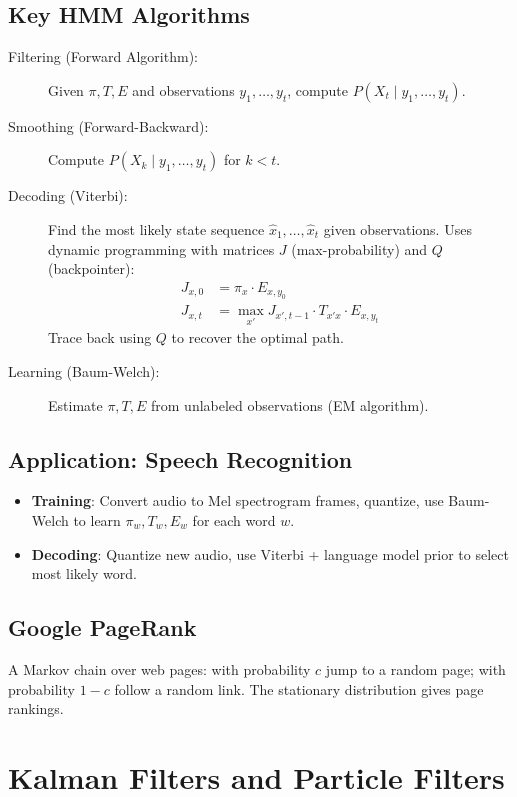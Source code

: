 \documentclass[11pt]{article}
\begin{document}
\subsection{Key HMM Algorithms}

\begin{description}
  \item[Filtering (Forward Algorithm):] Given $\pi, T, E$ and observations $y_1, \ldots, y_t$, compute $P(X_t \mid y_1, \ldots, y_t)$.
  \item[Smoothing (Forward-Backward):] Compute $P(X_k \mid y_1, \ldots, y_t)$ for $k < t$.
  \item[Decoding (Viterbi):] Find the most likely state sequence $\hat{x}_1, \ldots, \hat{x}_t$ given observations. Uses dynamic programming with matrices $J$ (max-probability) and $Q$ (backpointer):
    \begin{align*}
      J_{x,0} &= \pi_x \cdot E_{x,y_0} \\
      J_{x,t} &= \max_{x'} J_{x',t-1} \cdot T_{x'x} \cdot E_{x,y_t}
    \end{align*}
    Trace back using $Q$ to recover the optimal path.
  \item[Learning (Baum-Welch):] Estimate $\pi, T, E$ from unlabeled observations (EM algorithm).
\end{description}

\subsection{Application: Speech Recognition}
\begin{itemize}
  \item \textbf{Training}: Convert audio to Mel spectrogram frames, quantize, use Baum-Welch to learn $\pi_w, T_w, E_w$ for each word $w$.
  \item \textbf{Decoding}: Quantize new audio, use Viterbi + language model prior to select most likely word.
\end{itemize}

\subsection{Google PageRank}
A Markov chain over web pages: with probability $c$ jump to a random page; with probability $1-c$ follow a random link. The stationary distribution gives page rankings.

\section{Kalman Filters and Particle Filters}
\end{document}
